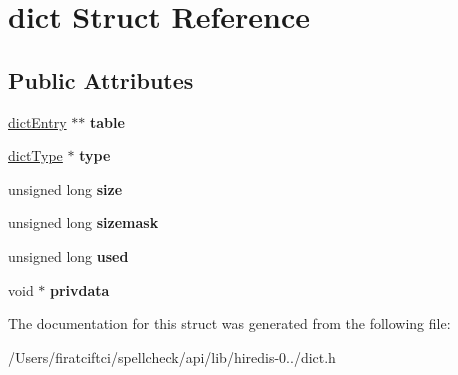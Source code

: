 \hypertarget{structdict}{}\section{dict Struct Reference}
\label{structdict}
\subsection*{Public Attributes}
\begin{DoxyCompactItemize}
\item 
\mbox{\label{structdict_a22d4788abe9d2d3ee5232d0b22fb13a5}} 
\mbox{\hyperlink{structdict_entry}{dict\+Entry}} $\ast$$\ast$ {\bfseries table}
\item 
\mbox{\label{structdict_a89da3d5d54bd930937587a3c411af5fd}} 
\mbox{\hyperlink{structdict_type}{dict\+Type}} $\ast$ {\bfseries type}
\item 
\mbox{\label{structdict_a296b58c7e6078a0dd8077e1432ac58b4}} 
unsigned long {\bfseries size}
\item 
\mbox{\label{structdict_ac948fbd3c50396124dad4e3a26431043}} 
unsigned long {\bfseries sizemask}
\item 
\mbox{\label{structdict_a99eb5e81eea744d77d84dc591e7cecca}} 
unsigned long {\bfseries used}
\item 
\mbox{\label{structdict_a36ce9f4e7d035fa4d7d2886f30b6a9af}} 
void $\ast$ {\bfseries privdata}
\end{DoxyCompactItemize}


The documentation for this struct was generated from the following file\+:\begin{DoxyCompactItemize}
\item 
/\+Users/firatciftci/spellcheck/api/lib/hiredis-\/0../dict.\+h\end{DoxyCompactItemize}
